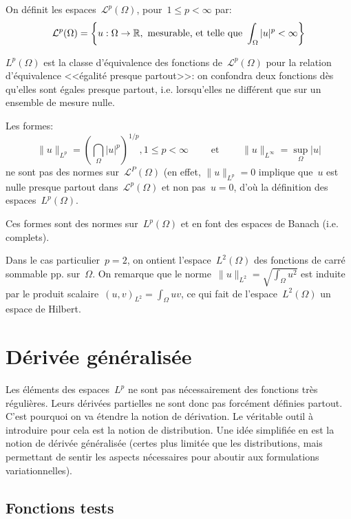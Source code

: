 On définit les espaces~$\mathscr{L}^p(\Omega)$, pour~$1\le p<\infty$ par:
\[
\mathcal{L}^p(\Omega)=\left\{u:\Omega\rightarrow\mathbb R, \text{ mesurable, et telle que }
\displaystyle\int_\Omega|u|^p<\infty\right\}
\]

\medskip
$L^p(\Omega)$ est la classe d'équivalence des fonctions de~$\mathscr{L}^ p(\Omega)$ 
pour la relation d'équivalence <<égalité presque partout>>: on confondra deux fonctions 
dès qu'elles sont égales presque partout, i.e. lorsqu'elles ne différent que sur un ensemble
de mesure nulle.

Les formes:
\[
\|u\|_{L^p}=\left(\dint_\Omega |u|^p\right)^{1/p}, 1\le p<\infty \qquad \text{ et }
\qquad \|u\|_{L^\infty}=\sup_\Omega |u|
\]
ne sont pas des normes sur~$\mathscr{L}^P(\Omega)$
(en effet, $\|u\|_{L^p}=0$ implique que~$u$ est nulle presque partout dans~$\mathscr{L}^p(\Omega)$
et non pas~$u = 0$, d'où la définition des espaces~$L^p(\Omega)$.

Ces formes sont des normes sur~$L^p(\Omega)$ et en font des espaces de Banach (i.e. complets).

\medskip
Dans le cas particulier~$p=2$, on ontient l'espace~$L^2(\Omega)$ des fonctions de carré 
sommable pp. sur~$\Omega$. On remarque que le norme~$\|u\|_{L^2}=\sqrt{\int_\Omega u^2}$
est induite par le produit scalaire~$(u,v)_{L^2}=\int_\Omega uv$, ce qui fait de
l'espace~$L^2(\Omega)$ un espace de Hilbert.





\medskip
\section*{Dérivée généralisée}

Les éléments des espaces~$L^p$ ne sont pas nécessairement des fonctions très régulières.
Leurs dérivées partielles ne sont donc pas forcément définies partout.
C'est pourquoi on va étendre la notion de dérivation. 
Le véritable outil à introduire pour cela est la notion de distribution.
Une idée simplifiée en est la notion de dérivée généralisée (certes plus limitée que
les distributions, mais permettant de sentir les aspects nécessaires pour aboutir aux formulations
variationnelles).

\medskip
\subsection*{Fonctions tests}

